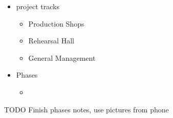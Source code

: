 \documentclass[12pt]{article}
\begin{document}
\begin{itemize}
\begin{itemize}
                    \item project tracks
                    \begin{itemize}
                        \item Production Shops
                        \item Rehearsal Hall
                        \item General Management
                    \end{itemize}
                    \item Phases
                    \begin{itemize}
                        \item 
                    \end{itemize}
                \end{itemize}
            \end{itemize}
            \newpage
TODO Finish phases notes, use pictures from phone
\end{document}
